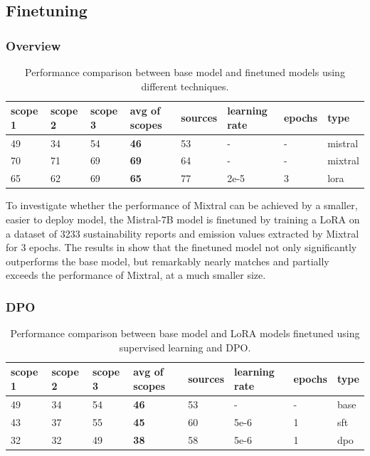 \documentclass[]{article}
\begin{document}
	\subsection{Finetuning}
	\subsubsection{Overview}


\begin{table}[h]
	\centering
	\begin{tabular}{l|l|l|l|l|l|l|l|}
		\hline
		scope 1 & scope 2 & scope 3 & avg of scopes & sources & learning rate & epochs & type \\\hline
		49 & 34 & 54 & \textbf{46} & 53 & - & - & mistral \\\hline
		70 & 71 & 69 & \textbf{69} & 64 & - & - & mixtral \\\hline
		65 & 62 & 69 & \textbf{65} & 77 & 2e-5 & 3 & lora \\\hline
	\end{tabular}
	\caption{Performance comparison between base model and finetuned models using different techniques.}
	\label{tab:finetuning-comparison}
\end{table}

	To investigate whether the performance of Mixtral can be achieved by a smaller, easier to deploy model, the Mistral-7B model is finetuned by training a LoRA on a dataset of 3233 sustainability reports and emission values extracted by Mixtral for 3 epochs. The results in  show that the finetuned model not only significantly outperforms the base model, but remarkably nearly matches and partially exceeds the performance of Mixtral, at a much smaller size.


\subsubsection{DPO}

\begin{table}[h]
	\centering
	\begin{tabular}{|l|l|l|l|l|l|l|l|}
		\hline
		scope 1 & scope 2 & scope 3 & avg of scopes & sources & learning rate & epochs & type \\\hline
		49 & 34 & 54 & \textbf{46} & 53 & - & - & base \\\hline
		43 & 37 & 55 & \textbf{45} & 60 & 5e-6 & 1 & sft \\\hline
		32 & 32 & 49 & \textbf{38} & 58 & 5e-6 & 1 & dpo \\\hline
	\end{tabular}
	\caption{Performance comparison between base model and LoRA models finetuned using supervised learning and DPO.}
	\label{tab:dpo-comparison}
\end{table}
\end{document}
